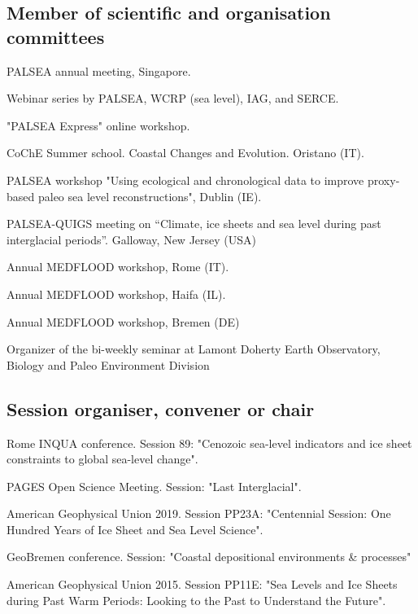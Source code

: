 \documentclass[11pt]{article}
\begin{document}
\bigskip
{\normalfont 
\subsection{Member of scientific and organisation committees}}
{\footnotesize
\begin{description}
  \item [2022] PALSEA annual meeting, Singapore.
  \item [2021] Webinar series by PALSEA, WCRP (sea level), IAG, and SERCE.
  \item [2020] "PALSEA Express" online workshop.
  \item [2019] CoChE Summer school. Coastal Changes and Evolution. Oristano (IT).
  \item [2019] PALSEA workshop "Using ecological and chronological data to improve proxy-based paleo sea level reconstructions", Dublin (IE).
  \item [2017] PALSEA-QUIGS meeting on “Climate, ice sheets and sea level during past interglacial periods”. Galloway, New Jersey (USA)
  \item [2012] Annual MEDFLOOD workshop, Rome (IT).
  \item [2014] Annual MEDFLOOD workshop, Haifa (IL).
  \item [2016] Annual MEDFLOOD workshop, Bremen (DE)
  \item [2013] Organizer of the bi-weekly seminar at Lamont Doherty Earth Observatory, Biology and Paleo Environment Division
  \item \end{description}}

{\normalfont 
\subsection{Session organiser, convener or chair}}
{\footnotesize
\begin{description}
  \item [2023] Rome INQUA conference. Session 89: "Cenozoic sea-level indicators and ice sheet constraints to global sea-level change".
  \item [2022] PAGES Open Science Meeting. Session: "Last Interglacial".
  \item [2019] American Geophysical Union 2019. Session PP23A: "Centennial Session: One Hundred Years of Ice Sheet and Sea Level Science".
  \item [2017] GeoBremen conference. Session: "Coastal depositional environments \& processes"
  \item [2015] American Geophysical Union 2015. Session PP11E: "Sea Levels and Ice Sheets during Past Warm Periods: Looking to the Past to Understand the Future".
  \item \end{description}}
\end{document}
